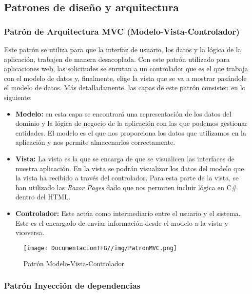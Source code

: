 \subsection{Patrones de diseño y arquitectura}

\subsubsection{Patrón de Arquitectura MVC (Modelo-Vista-Controlador)}
Este patrón \cite{patronmvc:latex} se utiliza para que la interfaz de usuario, los datos y la lógica de la aplicación, trabajen de manera desacoplada. Con este patrón utilizado para aplicaciones web, las solicitudes se enrutan a un controlador que es el que trabaja con el modelo de datos y, finalmente, elige la vista que se va a mostrar pasándole el modelo de datos. Más detalladamente, las capas de este patrón consisten en lo siguiente:

\begin{itemize}
    \item \textbf{Modelo:} en esta capa se encontrará una representación de los datos del dominio y la lógica de negocio de la aplicación con las que podemos gestionar entidades. El modelo es el que nos proporciona los datos que utilizamos en la aplicación y nos permite almacenarlos correctamente.
    \item \textbf{Vista:} La vista es la que se encarga de que se visualicen las interfaces de nuestra aplicación. En la vista se podrán visualizar los datos del modelo que la vista ha recibido a través del controlador.
    Para esta parte de la vista, se han utilizado las \textit{Razor Pages} dado que nos permiten incluir lógica en C\# dentro del HTML.
    \item \textbf{Controlador:} Este actúa como intermediario entre el usuario y el sistema. Este es el encargado de enviar información desde el modelo a la vista y viceversa.
\end{itemize}

\begin{figure}[H]
    \centering
    \texttt{[image: DocumentacionTFG//img/PatronMVC.png]}
    \caption{Patrón Modelo-Vista-Controlador}
\end{figure}

\subsubsection{Patrón Inyección de dependencias}

